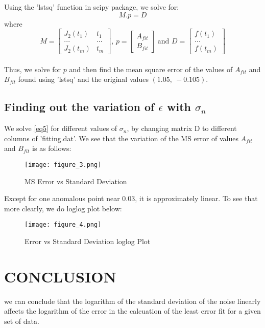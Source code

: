 \documentclass[11pt, a4paper]{article}
\begin{document}
            Using the 'lstsq' function in scipy package, we solve for:
            \begin{equation}
            M.p = D \label{eq5}
            \end{equation}
            where
            \begin{equation}
            M=\left[\begin{matrix}
            J_2(t_1)&t_1\\
            ...&...\\
            J_2(t_m)&t_m
            \end{matrix}\right]\text{, }p=\left[\begin{matrix}
            A_{fit}\\B_{fit}
            \end{matrix}\right]\ \text{and }D=\left[\begin{matrix}f(t_1)\\...\\f(t_m)\end{matrix}\right]
            \end{equation}\\

            Thus, we solve for $p$ and then find the mean square error of the values of $A_{fit}$ and $B_{fit}$ found using 'lstsq' and the original values $(1.05,\ -0.105)$.

        \subsection{Finding out the variation of $\epsilon$ with $\sigma_n$}
            We solve \eqref{eq5} for different values of $\sigma_n$, by changing matrix D to different columns of 'fitting.dat'. We see that the variation of the MS error of values $A_{fit}$ and $B_{fit}$ is as follows:
            \begin{figure}[H]
                \centering
                \texttt{[image: figure\_3.png]} 
                \caption{MS Error vs Standard Deviation}
                \label{fig:figure_3}
            \end{figure}

            Except for one anomalous point near 0.03, it is approximately linear. 
            To see that more clearly, we do loglog plot below:
            \begin{figure}[H]
                \centering
                \texttt{[image: figure\_4.png]} 
                \caption{Error vs Standard Deviation loglog Plot}
                \label{fig:figure_4}
            \end{figure}

    \section{CONCLUSION}
     we can conclude that the logarithm of the standard deviation of the noise linearly affects the logarithm of the error in the calcuation of the least error fit for a given set of data.
\end{document}
